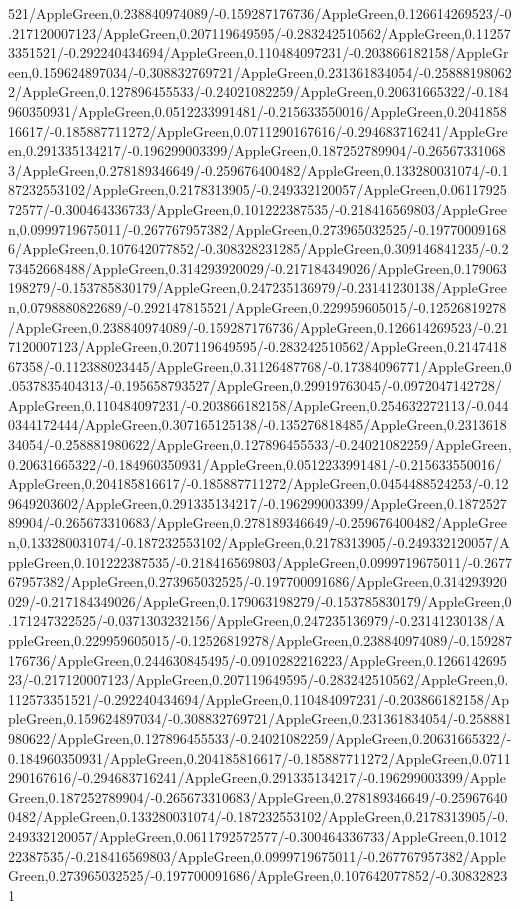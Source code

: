 {\begin{tikzternal}
{521/AppleGreen,0.238840974089/-0.159287176736/AppleGreen,0.126614269523/-0.217120007123/AppleGreen,0.207119649595/-0.283242510562/AppleGreen,0.112573351521/-0.292240434694/AppleGreen,0.110484097231/-0.203866182158/AppleGreen,0.159624897034/-0.308832769721/AppleGreen,0.231361834054/-0.258881980622/AppleGreen,0.127896455533/-0.24021082259/AppleGreen,0.20631665322/-0.184960350931/AppleGreen,0.0512233991481/-0.215633550016/AppleGreen,0.204185816617/-0.185887711272/AppleGreen,0.0711290167616/-0.294683716241/AppleGreen,0.291335134217/-0.196299003399/AppleGreen,0.187252789904/-0.265673310683/AppleGreen,0.278189346649/-0.259676400482/AppleGreen,0.133280031074/-0.187232553102/AppleGreen,0.2178313905/-0.249332120057/AppleGreen,0.0611792572577/-0.300464336733/AppleGreen,0.101222387535/-0.218416569803/AppleGreen,0.0999719675011/-0.267767957382/AppleGreen,0.273965032525/-0.197700091686/AppleGreen,0.107642077852/-0.308328231285/AppleGreen,0.309146841235/-0.273452668488/AppleGreen,0.314293920029/-0.217184349026/AppleGreen,0.179063198279/-0.153785830179/AppleGreen,0.247235136979/-0.23141230138/AppleGreen,0.0798880822689/-0.292147815521/AppleGreen,0.229959605015/-0.12526819278/AppleGreen,0.238840974089/-0.159287176736/AppleGreen,0.126614269523/-0.217120007123/AppleGreen,0.207119649595/-0.283242510562/AppleGreen,0.214741867358/-0.112388023445/AppleGreen,0.31126487768/-0.17384096771/AppleGreen,0.0537835404313/-0.195658793527/AppleGreen,0.29919763045/-0.0972047142728/AppleGreen,0.110484097231/-0.203866182158/AppleGreen,0.254632272113/-0.0440344172444/AppleGreen,0.307165125138/-0.135276818485/AppleGreen,0.231361834054/-0.258881980622/AppleGreen,0.127896455533/-0.24021082259/AppleGreen,0.20631665322/-0.184960350931/AppleGreen,0.0512233991481/-0.215633550016/AppleGreen,0.204185816617/-0.185887711272/AppleGreen,0.0454488524253/-0.129649203602/AppleGreen,0.291335134217/-0.196299003399/AppleGreen,0.187252789904/-0.265673310683/AppleGreen,0.278189346649/-0.259676400482/AppleGreen,0.133280031074/-0.187232553102/AppleGreen,0.2178313905/-0.249332120057/AppleGreen,0.101222387535/-0.218416569803/AppleGreen,0.0999719675011/-0.267767957382/AppleGreen,0.273965032525/-0.197700091686/AppleGreen,0.314293920029/-0.217184349026/AppleGreen,0.179063198279/-0.153785830179/AppleGreen,0.171247322525/-0.0371303232156/AppleGreen,0.247235136979/-0.23141230138/AppleGreen,0.229959605015/-0.12526819278/AppleGreen,0.238840974089/-0.159287176736/AppleGreen,0.244630845495/-0.0910282216223/AppleGreen,0.126614269523/-0.217120007123/AppleGreen,0.207119649595/-0.283242510562/AppleGreen,0.112573351521/-0.292240434694/AppleGreen,0.110484097231/-0.203866182158/AppleGreen,0.159624897034/-0.308832769721/AppleGreen,0.231361834054/-0.258881980622/AppleGreen,0.127896455533/-0.24021082259/AppleGreen,0.20631665322/-0.184960350931/AppleGreen,0.204185816617/-0.185887711272/AppleGreen,0.0711290167616/-0.294683716241/AppleGreen,0.291335134217/-0.196299003399/AppleGreen,0.187252789904/-0.265673310683/AppleGreen,0.278189346649/-0.259676400482/AppleGreen,0.133280031074/-0.187232553102/AppleGreen,0.2178313905/-0.249332120057/AppleGreen,0.0611792572577/-0.300464336733/AppleGreen,0.101222387535/-0.218416569803/AppleGreen,0.0999719675011/-0.267767957382/AppleGreen,0.273965032525/-0.197700091686/AppleGreen,0.107642077852/-0.308328231}
\end{tikzternal}}
